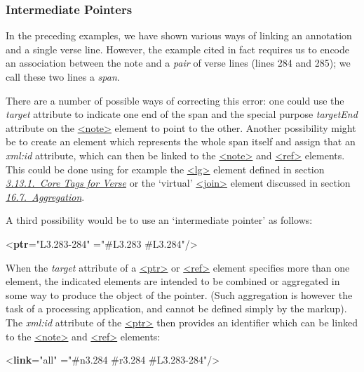 \subsubsection[{Intermediate Pointers}]{Intermediate Pointers}\label{SAPTIP}\par
In the preceding examples, we have shown various ways of linking an annotation and a single verse line. However, the example cited in fact requires us to encode an association between the note and a \textit{pair} of verse lines (lines 284 and 285); we call these two lines a \textit{span}.\par
There are a number of possible ways of correcting this error: one could use the {\itshape target} attribute to indicate one end of the span and the special purpose {\itshape targetEnd} attribute on the \hyperref[TEI.note]{<note>} element to point to the other. Another possibility might be to create an element which represents the whole span itself and assign that an {\itshape xml:id} attribute, which can then be linked to the \hyperref[TEI.note]{<note>} and \hyperref[TEI.ref]{<ref>} elements. This could be done using for example the \hyperref[TEI.lg]{<lg>} element defined in section \textit{\hyperref[COVE]{3.13.1.\ Core Tags for Verse}} or the ‘virtual’ \hyperref[TEI.join]{<join>} element discussed in section \textit{\hyperref[SAAG]{16.7.\ Aggregation}}.\par
A third possibility would be to use an ‘intermediate pointer’ as follows: \par\bgroup{}\exampleFont \begin{shaded}\noindent\mbox{}{<\textbf{ptr}\hspace*{1em}{xml:id}="{L3.283-284}"\mbox{}\newline 
\hspace*{1em}{target}="{\#L3.283 \#L3.284}"/>}\end{shaded}\egroup\par \noindent  When the {\itshape target} attribute of a \hyperref[TEI.ptr]{<ptr>} or \hyperref[TEI.ref]{<ref>} element specifies more than one element, the indicated elements are intended to be combined or aggregated in some way to produce the object of the pointer. (Such aggregation is however the task of a processing application, and cannot be defined simply by the markup). The {\itshape xml:id} attribute of the \hyperref[TEI.ptr]{<ptr>} then provides an identifier which can be linked to the \hyperref[TEI.note]{<note>} and \hyperref[TEI.ref]{<ref>} elements: \par\bgroup{}\exampleFont \begin{shaded}\noindent\mbox{}{<\textbf{link}\hspace*{1em}{evaluate}="{all}"\mbox{}\newline 
\hspace*{1em}{target}="{\#n3.284 \#r3.284 \#L3.283-284}"/>}\end{shaded}\egroup\par \noindent  \par
